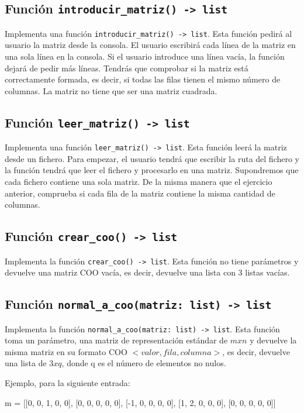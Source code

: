 \documentclass[10pt,a4paper]{article}
\begin{document}
\subsection*{Función \lstinline|introducir_matriz() -> list|}
Implementa una función \lstinline|introducir_matriz() -> list|. Esta función pedirá al usuario la matriz desde la consola. El usuario escribirá cada línea de la matriz en una sola línea en la consola. Si el usuario introduce una línea vacía, la función dejará de pedir más líneas. Tendrás que comprobar si la matriz está correctamente formada, es decir, si todas las filas tienen el mismo número de columnas. La matriz no tiene que ser una matriz cuadrada.

\subsection*{Función \lstinline|leer_matriz() -> list|}
Implementa una función \lstinline|leer_matriz() -> list|. Esta función leerá la matriz desde un fichero. Para empezar, el usuario tendrá que escribir la ruta del fichero y la función tendrá que leer el fichero y procesarlo en una matriz. Supondremos que cada fichero contiene una sola matriz. De la misma manera que el ejercicio anterior, comprueba si cada fila de la matriz contiene la misma cantidad de columnas.

\subsection*{Función \lstinline|crear_coo() -> list|}
Implementa la función \lstinline|crear_coo() -> list|. Esta función no tiene parámetros y devuelve una matriz COO vacía, es decir, devuelve una lista con 3 listas vacías.

\subsection*{Función \lstinline|normal_a_coo(matriz: list) -> list|}
Implementa la función \lstinline|normal_a_coo(matriz: list) -> list|. Esta función toma un parámetro, una matriz de representación estándar de $m x n$ y devuelve la misma matriz en su formato COO $<valor, fila, columna>$, es decir, devuelve una lista de $3 x q$, donde q es el número de elementos no nulos.

Ejemplo, para la siguiente entrada:

\begin{attachedlisting}[sparse2]
m = [[0, 0, 1, 0, 0],
     [0, 0, 0, 0, 0],
     [-1, 0, 0, 0, 0],
     [1, 2, 0, 0, 0],
     [0, 0, 0, 0, 0]]
\end{attachedlisting}
\end{document}
